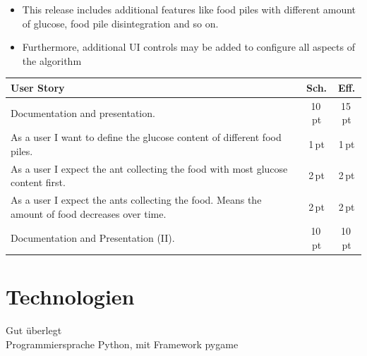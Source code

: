 \begin{itemize}[noitemsep]
\item This release includes additional features like food piles with different amount of glucose, food pile disintegration and so on.
\item Furthermore, additional UI controls may be added to configure all aspects of the algorithm
\end{itemize}


\begin{table}[H]
\small\sffamily\renewcommand{\arraystretch}{1.5}
\begin{tabular}{| p{12cm} | c | c |}
  \hline
  \bfseries{User Story} & \bfseries{Sch.} & \bfseries{Eff.}  \\
  \hline
  Documentation and presentation. & 10\,pt & 15\,pt \\
  \hline
  As a user I want to define the glucose content of different food piles. & 1\,pt &1\,pt \\
  \hline
  As a user I expect the ant collecting the food with most glucose content first. & 2\,pt &2\,pt \\
  \hline
  As a user I expect the ants collecting the food. Means the amount of food decreases over time. & 2\,pt & 2\,pt \\
  \hline
  Documentation and Presentation (II). & 10\,pt & 10\,pt \\
  \hline
\end{tabular}
\end{table}



\section{Technologien}

Gut überlegt \\

Programmiersprache Python, mit Framework pygame

